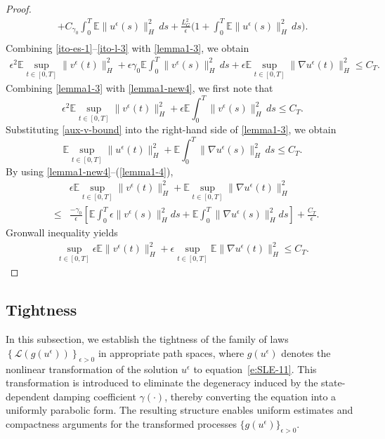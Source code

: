 \documentclass[11pt]{article}
\theoremstyle{plain}
\numberwithin{equation}{section}
\begin{document}
\begin{proof}
\begin{eqnarray}
+ C_{\gamma_0}\int_0^T \mathbb{E}\|u^\epsilon(s)\|_H^2\,ds
+ \frac{L_G^2}{\epsilon}
\Big(1+\int_0^T \mathbb{E}\|u^\epsilon(s)\|_H^2\,ds\Big).\nonumber\\
\end{eqnarray}
Combining \eqref{ito-es-1}--\eqref{ito-l-3} with \eqref{lemma1-3},
we obtain
\begin{eqnarray}\label{lemma1-new4}
\epsilon^2 \mathbb{E}\sup_{t\in[0,T]}\|v^{\epsilon}(t)\|_{H}^2
+ \epsilon\gamma_0 \mathbb{E}\int_0^T \|v^{\epsilon}(s)\|_{H}^2\,ds
+ \epsilon \mathbb{E}\sup_{t\in[0,T]}\|\nabla u^{\epsilon}(t)\|_{H}^2
\le C_T .
\end{eqnarray}
Combining \eqref{lemma1-3} with \eqref{lemma1-new4}, we first note that
\begin{equation}\label{aux-v-bound}
\epsilon^2 \mathbb{E}\sup_{t\in[0,T]}\|v^{\epsilon}(t)\|_{H}^2
+ \epsilon \mathbb{E}\int_0^T \|v^{\epsilon}(s)\|_{H}^2\,ds
\le C_T .
\end{equation}
Substituting \eqref{aux-v-bound} into the right-hand side of
\eqref{lemma1-3}, we obtain
\begin{equation}\label{lemma1-4}
\mathbb{E}\sup_{t\in[0,T]}\|u^{\epsilon}(t)\|_{H}^2
+ \mathbb{E}\int_0^T \|\nabla u^{\epsilon}(s)\|_{H}^2\,ds
\le C_T .
\end{equation}
By using \eqref{lemma1-new4}--(\ref{lemma1-4}),
\begin{eqnarray}
&&\epsilon \mathbb{E}\sup_{t\in [0,T]}\| v^{\epsilon  }(t)\|_{H}^2 +  \mathbb{E}\sup_{t\in [0,T]}  \|\nabla u^{\epsilon  }(t)\|_{H}^2  \nonumber\\
&\leq & \frac{-\gamma_0}{\epsilon}
\left[\mathbb{E} \int_0^T \epsilon\|v^{\epsilon  }(s)\|_{H}^2 {d}s + \mathbb{E} \int_0^T \|\nabla u^{\epsilon  }(s)\|_{H}^2  {d}s \right] +  \frac{C_T}{\epsilon}.
\end{eqnarray}
 Gronwall inequality yields
\begin{eqnarray}\label{lemma1-H1}
\sup_{t\in [0,T]}\epsilon \mathbb{E}\| v^{\epsilon   }(t)\|_{H}^2 +\epsilon \sup_{t\in [0,T]} \mathbb{E}  \|\nabla u^{\epsilon }(t)\|_{H}^2
\leq   C_T .
\end{eqnarray}
 

\end{proof}

  
 
 
 
 
 

\subsection{Tightness}\label{subsec:tight}
In this subsection, we establish the tightness of the family of laws $\left\{ \mathcal{L}(g(u^\epsilon)) \right\}_{\epsilon > 0}$ in appropriate path spaces, where $g(u^\epsilon)$ denotes the nonlinear transformation of the solution $u^\epsilon$ to equation~\eqref{e:SLE-11}. This transformation is introduced to eliminate the degeneracy induced by the state-dependent damping coefficient $\gamma(\cdot)$, thereby converting the equation into a uniformly parabolic form. The resulting structure enables uniform estimates and compactness arguments for the transformed processes $\{g(u^\epsilon)\}_{\epsilon > 0}$.
\end{document}
